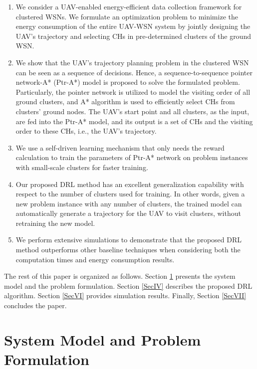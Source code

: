 \documentclass[journal]{IEEEtran}
\begin{document}
	\begin{enumerate}
		\item We consider a UAV-enabled energy-efficient data collection framework for clustered WSNs. We formulate an optimization problem to minimize the energy consumption of the entire UAV-WSN system by jointly designing the UAV's trajectory and selecting CHs in pre-determined clusters of the ground WSN.
				
		\item We show that the UAV's trajectory planning problem in the clustered WSN can be seen as a sequence of decisions. Hence, a sequence-to-sequence pointer network-A* (Ptr-A*) model is proposed to solve the formulated problem. Particularly, the  pointer network is utilized to model the visiting order of all ground clusters, and A* algorithm\cite{V. Razo and H. Jacobsen} is used to efficiently select CHs from clusters' ground nodes. The UAV's start point and all clusters, as the input, are fed into the Ptr-A* model, and its output is a set of CHs and the visiting order to these CHs, i.e., the UAV's trajectory.
		
		\item We use a self-driven learning mechanism that only needs the reward calculation to train the parameters of Ptr-A* network on problem instances with small-scale clusters for faster training.
		
				
		\item Our proposed DRL method has an excellent generalization capability with respect to the number of clusters used for training. In other words, given a new problem instance with any number of clusters, the trained model can automatically generate a trajectory for the UAV to visit clusters, without retraining the new model.
		
		\item We perform extensive simulations to demonstrate that the proposed DRL method outperforms other baseline techniques when considering both the computation times and energy consumption results.
	\end{enumerate}
	
	The rest of this paper is organized as follows. Section \ref{SecIII} presents the system model and the problem formulation. Section \ref{SecIV} describes the proposed DRL algorithm. Section \ref{SecVI} provides simulation results. Finally, Section \ref{SecVII} concludes the paper.
	
	
	\section{System Model and Problem Formulation}\label{SecIII}
	
\end{document}
